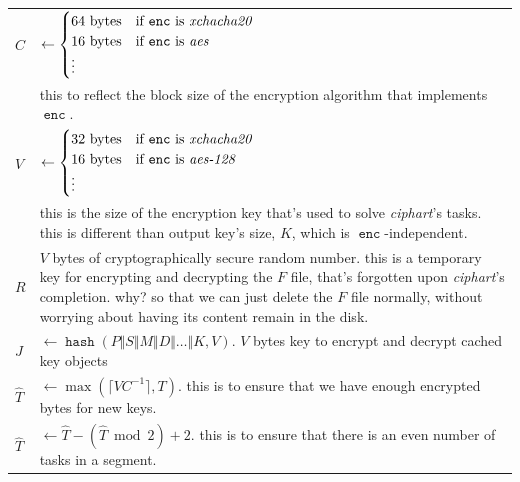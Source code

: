\documentclass[twocolumn]{article}
\DeclareMathOperator{\enc}{\mathtt{enc}}
\DeclareMathOperator{\maxf}{max}
\DeclareMathOperator{\hash}{\mathtt{hash}}
\begin{document}
\begin{tabularx}{\columnwidth}{lX}
    $C$         & $\gets \begin{cases}
                        64 \text{ bytes} & \text{if $\enc$ is
                                            \emph{xchacha20}}\\
                        16 \text{ bytes} & \text{if $\enc$ is \emph{aes}}\\
                        \vdots & \\
                     \end{cases}$\\
                & this to reflect the block size of the encryption
                    algorithm that implements $\enc$.\\
    $V$ & $\gets \begin{cases}
                        32 \text{ bytes} & \text{if $\enc$ is
                                            \emph{xchacha20}}\\
                        16 \text{ bytes} & \text{if $\enc$ is
                            \emph{aes-128}}\\
                        \vdots & \\
                     \end{cases}$\\
                & this is the size of the encryption key that's used to
                    solve \emph{ciphart}'s tasks.  this is different than
                    output key's size, $K$, which is $\enc$-independent.\\
    $R$         & $V$ bytes of cryptographically secure random number.
                    this is a temporary key for encrypting and decrypting
                    the $F$ file, that's forgotten upon \emph{ciphart}'s
                    completion.  why?  so that we can just delete the $F$
                    file normally, without worrying about having its
                    content remain in the disk.\\
    $J$         & $\gets \hash(P \Vert S \Vert M \Vert D \Vert \ldots
                    \Vert K, V)$.  $V$ bytes key to encrypt and decrypt
                    cached key objects\\
    $\hat T$    & $\gets \maxf(\lceil V C^{-1}\rceil, T)$.  this
                    is to ensure that we have enough encrypted bytes for
                    new keys.\\
    $\hat T$    & $\gets \hat T - (\hat T \bmod 2) + 2$.  this is to ensure
                    that there is an even number of tasks in a segment.

\end{tabularx}
\end{document}
